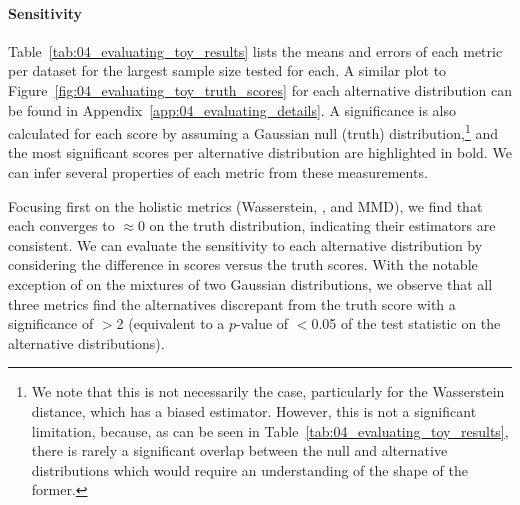 \paragraph{Sensitivity}

Table~\ref{tab:04_evaluating_toy_results} lists the means and errors of each metric per dataset for the largest sample size tested for each.
A similar plot to Figure~\ref{fig:04_evaluating_toy_truth_scores} for each alternative distribution can be found in Appendix~\ref{app:04_evaluating_details}.
A significance is also calculated for each score by assuming a Gaussian null (truth) distribution,\footnote{We note that this is not necessarily the case, particularly for the Wasserstein distance, which has a biased estimator.
However, this is not a significant limitation, because, as can be seen in Table~\ref{tab:04_evaluating_toy_results}, there is rarely a significant overlap between the null and alternative distributions which would require an understanding of the shape of the former.}
and the most significant scores per alternative distribution are highlighted in bold.
We can infer several properties of each metric from these measurements.

\begin{table}
    \centering
    \caption[Values, significances, and errors of metrics, as defined in Section~\ref{sec:04_evaluating_toydata}, for each (mixture of) Gaussian distribution(s), for the largest sample size tested.]
    {Values, significances, and errors of metrics, as defined in Section~\ref{sec:04_evaluating_toydata}, for each (mixture of) Gaussian distribution(s), for the largest sample size tested.
    The most significant scores per distribution are in bold.
    \label{tab:04_evaluating_toy_results}
    }
    \scriptsize
    \centering{}
\end{table}

Focusing first on the holistic metrics (Wasserstein, \fgdinf, and MMD), we find that each converges to ${\approx}0$ on the truth distribution, indicating their estimators are consistent.
We can evaluate the sensitivity to each alternative distribution by considering the difference in scores versus the truth scores.
With the notable exception of \fgdinf on the mixtures of two Gaussian distributions, we observe that all three metrics find the alternatives discrepant from the truth score with a significance of $>$2 (equivalent to a $p$-value of $<$0.05 of the test statistic on the alternative distributions).

